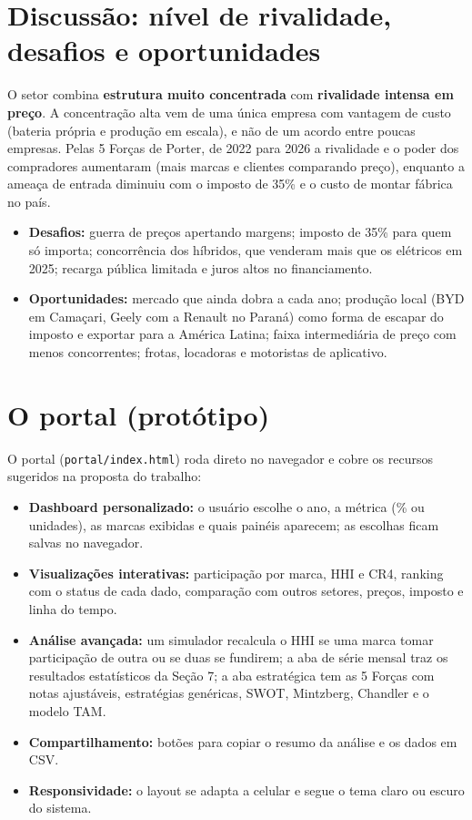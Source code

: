 \documentclass[11pt,a4paper]{article}
\begin{document}
\section{Discussão: nível de rivalidade, desafios e oportunidades}
O setor combina \textbf{estrutura muito concentrada} com \textbf{rivalidade intensa em preço}. A concentração alta vem de uma única empresa com vantagem de custo (bateria própria e produção em escala), e não de um acordo entre poucas empresas. Pelas 5 Forças de Porter, de 2022 para 2026 a rivalidade e o poder dos compradores aumentaram (mais marcas e clientes comparando preço), enquanto a ameaça de entrada diminuiu com o imposto de 35\% e o custo de montar fábrica no país.

\begin{itemize}
  \item \textbf{Desafios:} guerra de preços apertando margens; imposto de 35\% para quem só importa; concorrência dos híbridos, que venderam mais que os elétricos em 2025; recarga pública limitada e juros altos no financiamento.
  \item \textbf{Oportunidades:} mercado que ainda dobra a cada ano; produção local (BYD em Camaçari, Geely com a Renault no Paraná) como forma de escapar do imposto e exportar para a América Latina; faixa intermediária de preço com menos concorrentes; frotas, locadoras e motoristas de aplicativo.
\end{itemize}

\section{O portal (protótipo)}
O portal (\texttt{portal/index.html}) roda direto no navegador e cobre os recursos sugeridos na proposta do trabalho:
\begin{itemize}
  \item \textbf{Dashboard personalizado:} o usuário escolhe o ano, a métrica (\% ou unidades), as marcas exibidas e quais painéis aparecem; as escolhas ficam salvas no navegador.
  \item \textbf{Visualizações interativas:} participação por marca, HHI e CR4, ranking com o status de cada dado, comparação com outros setores, preços, imposto e linha do tempo.
  \item \textbf{Análise avançada:} um simulador recalcula o HHI se uma marca tomar participação de outra ou se duas se fundirem; a aba de série mensal traz os resultados estatísticos da Seção 7; a aba estratégica tem as 5 Forças com notas ajustáveis, estratégias genéricas, SWOT, Mintzberg, Chandler e o modelo TAM.
  \item \textbf{Compartilhamento:} botões para copiar o resumo da análise e os dados em CSV.
  \item \textbf{Responsividade:} o layout se adapta a celular e segue o tema claro ou escuro do sistema.
\end{itemize}
\end{document}
